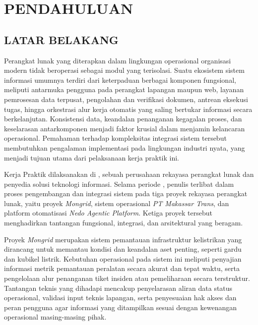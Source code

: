 \chapter{PENDAHULUAN}

\section{LATAR BELAKANG}

Perangkat lunak yang diterapkan dalam lingkungan operasional organisasi modern tidak beroperasi sebagai modul yang terisolasi. Suatu ekosistem sistem informasi umumnya terdiri dari keterpaduan berbagai komponen fungsional, meliputi antarmuka pengguna pada perangkat lapangan maupun web, layanan pemrosesan data terpusat, pengolahan dan verifikasi dokumen, antrean eksekusi tugas, hingga orkestrasi alur kerja otomatis yang saling bertukar informasi secara berkelanjutan. Konsistensi data, keandalan penanganan kegagalan proses, dan keselarasan antarkomponen menjadi faktor krusial dalam menjamin kelancaran operasional. Pemahaman terhadap kompleksitas integrasi sistem tersebut membutuhkan pengalaman implementasi pada lingkungan industri nyata, yang menjadi tujuan utama dari pelaksanaan kerja praktik ini.

Kerja Praktik dilaksanakan di \NamaPerusahaan, sebuah perusahaan rekayasa perangkat lunak dan penyedia solusi teknologi informasi. Selama periode \PeriodeKP, penulis terlibat dalam proses pengembangan dan integrasi sistem pada tiga proyek rekayasa perangkat lunak, yaitu proyek \textit{Mongrid}, sistem operasional \textit{PT Makassar Trans}, dan platform otomatisasi \textit{Nedo Agentic Platform}. Ketiga proyek tersebut menghadirkan tantangan fungsional, integrasi, dan arsitektural yang beragam.

Proyek \textit{Mongrid} merupakan sistem pemantauan infrastruktur kelistrikan yang dirancang untuk memantau kondisi dan keandalan aset penting, seperti gardu dan kubikel listrik. Kebutuhan operasional pada sistem ini meliputi penyajian informasi metrik pemantauan peralatan secara akurat dan tepat waktu, serta pengelolaan alur penanganan tiket insiden atau pemeliharaan secara terstruktur. Tantangan teknis yang dihadapi mencakup penyelarasan aliran data status operasional, validasi input teknis lapangan, serta penyesuaian hak akses dan peran pengguna agar informasi yang ditampilkan sesuai dengan kewenangan operasional masing-masing pihak.

